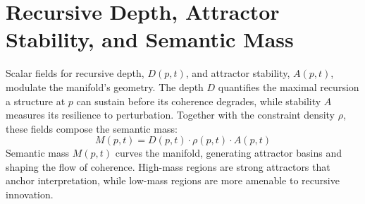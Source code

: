 \section{Recursive Depth, Attractor Stability, and Semantic Mass}

Scalar fields for recursive depth, \(D(p, t)\), and attractor stability, \(A(p, t)\), modulate the manifold's geometry. The depth \(D\) quantifies the maximal recursion a structure at \(p\) can sustain before its coherence degrades, while stability \(A\) measures its resilience to perturbation. Together with the constraint density \(\rho\), these fields compose the semantic mass:
\begin{equation}
M(p, t) = D(p, t) \cdot \rho(p, t) \cdot A(p, t)
\end{equation}
Semantic mass \(M(p,t)\) curves the manifold, generating attractor basins and shaping the flow of coherence. High-mass regions are strong attractors that anchor interpretation, while low-mass regions are more amenable to recursive innovation. 